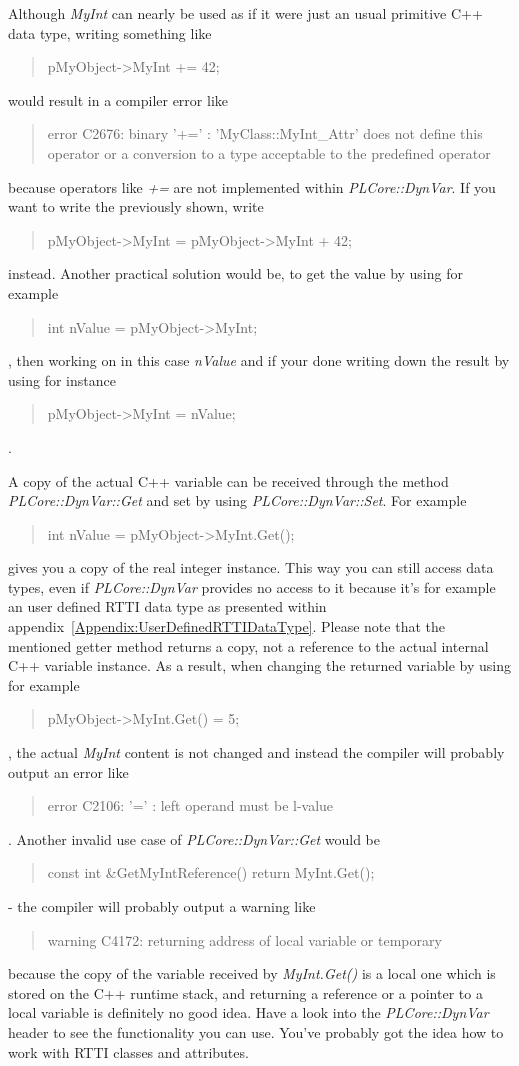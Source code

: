 Although \emph{MyInt} can nearly be used as if it were just an usual primitive C++ data type, writing something like \begin{quote}pMyObject->MyInt += 42;\end{quote} would result in a compiler error like \begin{quote}error C2676: binary '+=' : 'MyClass::MyInt\_Attr' does not define this operator or a conversion to a type acceptable to the predefined operator\end{quote} because operators like \emph{+=} are not implemented within \emph{PLCore::DynVar}. If you want to write the previously shown, write \begin{quote}pMyObject->MyInt = pMyObject->MyInt + 42;\end{quote} instead. Another practical solution would be, to get the value by using for example \begin{quote}int nValue = pMyObject->MyInt;\end{quote}, then working on in this case \emph{nValue} and if your done writing down the result by using for instance \begin{quote}pMyObject->MyInt = nValue;\end{quote}.

A copy of the actual C++ variable can be received through the method \emph{PLCore::DynVar::Get} and set by using \emph{PLCore::DynVar::Set}. For example \begin{quote}int nValue = pMyObject->MyInt.Get();\end{quote} gives you a copy of the real integer instance. This way you can still access data types, even if \emph{PLCore::DynVar} provides no access to it because it's for example an user defined \ac{RTTI} data type as presented within appendix~\ref{Appendix:UserDefinedRTTIDataType}. Please note that the mentioned getter method returns a copy, not a reference to the actual internal C++ variable instance. As a result, when changing the returned variable by using for example \begin{quote}pMyObject->MyInt.Get() = 5;\end{quote}, the actual \emph{MyInt} content is not changed and instead the compiler will probably output an error like \begin{quote}error C2106: '=' : left operand must be l-value\end{quote}. Another invalid use case of \emph{PLCore::DynVar::Get} would be \begin{quote}const int \&GetMyIntReference() { return MyInt.Get(); }\end{quote} - the compiler will probably output a warning like \begin{quote}warning C4172: returning address of local variable or temporary\end{quote} because the copy of the variable received by \emph{MyInt.Get()} is a local one which is stored on the C++ runtime stack, and returning a reference or a pointer to a local variable is definitely no good idea. Have a look into the \emph{PLCore::DynVar} header to see the functionality you can use. You've probably got the idea how to work with \ac{RTTI} classes and attributes.


